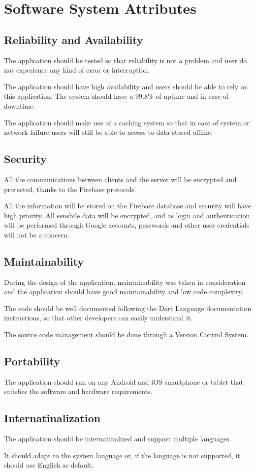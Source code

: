 \section{Software System Attributes}

\subsection{Reliability and Availability}
The application should  be tested so that reliability is not a problem and user do not experience any kind of error or interruption.

The application should have high availability and users should be able to rely on this application.
The system should have a 99.8\% of uptime and in case of downtime. 

The application should make use of a caching system so that in case of system or network failure users will still be able to access to data stored offline.

\subsection{Security}
All the communications between clients and the server will be encrypted and protected, thanks to the Firebase protocols.

All the information will be stored on the Firebase database and security will have high priority. All sensbile data will be encrypted,
and as login and authentication will be performed through Google accounts, passwords and other user credentials will not be a concern.

\subsection{Maintainability}
During the design of the application, maintainability was taken in consideration and the application should have good maintainability and low code complexity.

The code should be well documented following the Dart Language documentation instructions, so that other developers can easily understand it.

The source code management should be done through a Version Control System.


\subsection{Portability}
The application should run on any Android and iOS smartphone or 
tablet that satisfies the software and hardware requirements.

\subsection{Internatinalization}
The application should be internatinalized and support multiple languages.

It should adapt to the system language or, if the language is not supported, it should use English as default.